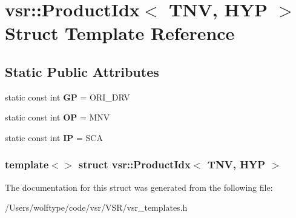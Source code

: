 \hypertarget{structvsr_1_1_product_idx_3_01_t_n_v_00_01_h_y_p_01_4}{\section{vsr\-:\-:Product\-Idx$<$ T\-N\-V, H\-Y\-P $>$ Struct Template Reference}
\label{structvsr_1_1_product_idx_3_01_t_n_v_00_01_h_y_p_01_4}
}
\subsection*{Static Public Attributes}
\begin{DoxyCompactItemize}
\item 
\hypertarget{structvsr_1_1_product_idx_3_01_t_n_v_00_01_h_y_p_01_4_ae2294a08905d598e3d600fea8d544b3c}{static const int {\bfseries G\-P} = O\-R\-I\-\_\-\-D\-R\-V}\label{structvsr_1_1_product_idx_3_01_t_n_v_00_01_h_y_p_01_4_ae2294a08905d598e3d600fea8d544b3c}

\item 
\hypertarget{structvsr_1_1_product_idx_3_01_t_n_v_00_01_h_y_p_01_4_a18b35be362c5c96db416d93712414182}{static const int {\bfseries O\-P} = M\-N\-V}\label{structvsr_1_1_product_idx_3_01_t_n_v_00_01_h_y_p_01_4_a18b35be362c5c96db416d93712414182}

\item 
\hypertarget{structvsr_1_1_product_idx_3_01_t_n_v_00_01_h_y_p_01_4_a898f7d77671f7b5d9df760d6d2045555}{static const int {\bfseries I\-P} = S\-C\-A}\label{structvsr_1_1_product_idx_3_01_t_n_v_00_01_h_y_p_01_4_a898f7d77671f7b5d9df760d6d2045555}

\end{DoxyCompactItemize}
\subsubsection*{template$<$$>$ struct vsr\-::\-Product\-Idx$<$ T\-N\-V, H\-Y\-P $>$}



The documentation for this struct was generated from the following file\-:\begin{DoxyCompactItemize}
\item 
/\-Users/wolftype/code/vsr/\-V\-S\-R/vsr\-\_\-templates.\-h\end{DoxyCompactItemize}
